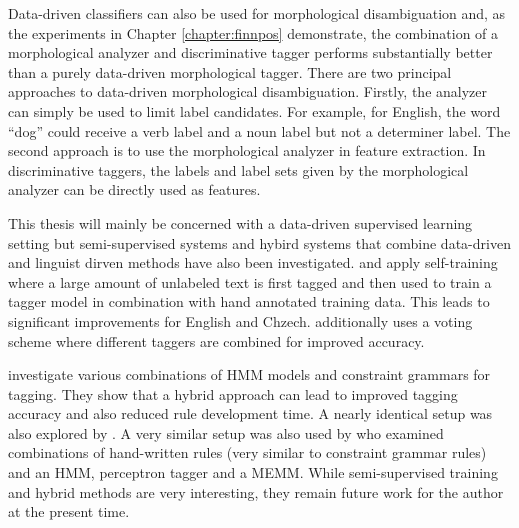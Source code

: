 Data-driven classifiers can also be used for morphological
disambiguation and, as the experiments in Chapter
\ref{chapter:finnpos} demonstrate, the combination of a morphological
analyzer and discriminative tagger performs substantially better than
a purely data-driven morphological tagger. There are two principal
approaches to data-driven morphological disambiguation. Firstly, the
analyzer can simply be used to limit label candidates. For example,
for English, the word ``dog'' could receive a verb label and a noun
label but not a determiner label. The second approach is to use the
morphological analyzer in feature extraction. In discriminative
taggers, the labels and label sets given by the morphological analyzer
can be directly used as features.

This thesis will mainly be concerned with a data-driven supervised
learning setting but semi-supervised systems and hybird systems that
combine data-driven and linguist dirven methods have also been
investigated. \cite{Spoustova2009} and \cite{Sogaard2011} apply
self-training where a large amount of unlabeled text is first tagged
and then used to train a tagger model in combination with hand
annotated training data. This leads to significant improvements for
English and Chzech. \cite{Spoustova2009} additionally uses a voting
scheme where different taggers are combined for improved accuracy.

\cite{Hulden2012} investigate various combinations of HMM models and
constraint grammars for tagging. They show that a hybrid approach can
lead to improved tagging accuracy and also reduced rule development
time. A nearly identical setup was also explored by
\cite{Orosz2013}. A very similar setup was also used by
\cite{Spoustova2007} who examined combinations of hand-written rules
(very similar to constraint grammar rules) and an HMM, perceptron
tagger and a MEMM. While semi-supervised training and hybrid methods are very
interesting, they remain future work for the author at the present
time. %

